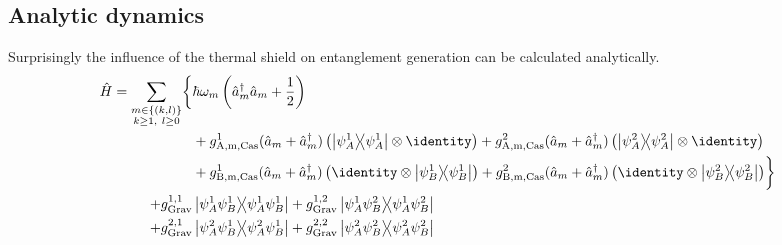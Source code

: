 \subsection{Analytic dynamics}
Surprisingly the influence of the thermal shield on entanglement generation can be calculated analytically.
\begin{align}\label{eq:5:hamiltonian}
  \begin{split}
    \op{H} = \sum_{\substack{m\in\{(k,l)\}\\ k \geq 1,\ l \geq 0}} \biggl\{ & \hbar \omega_m \left(\op{a}^\dagger_m \op{a}_m + \frac{1}{2}\right) \\
    &+ g^1_\mathrm{A,m,Cas}(\op{a}_m + \op{a}^\dagger_m) \left( \ketbra{\psi^1_A} \otimes \identity \right)
     + g^2_\mathrm{A,m,Cas}(\op{a}_m + \op{a}^\dagger_m) \left( \ketbra{\psi^2_A} \otimes \identity \right) \\
    &+ g^1_\mathrm{B,m,Cas}(\op{a}_m + \op{a}^\dagger_m) \left( \identity \otimes \ketbra{\psi^1_B} \right)
     + g^2_\mathrm{B,m,Cas}(\op{a}_m + \op{a}^\dagger_m) \left( \identity \otimes \ketbra{\psi^2_B} \right)\biggr\} \\
    + g^{1,1}_\mathrm{Grav}&\ketbra{\psi^1_A \psi^1_B} + g^{1,2}_\mathrm{Grav}\ketbra{\psi^1_A \psi^2_B} \\
    + g^{2,1}_\mathrm{Grav}&\ketbra{\psi^2_A \psi^1_B} + g^{2,2}_\mathrm{Grav}\ketbra{\psi^2_A \psi^2_B}
  \end{split}
\end{align}
